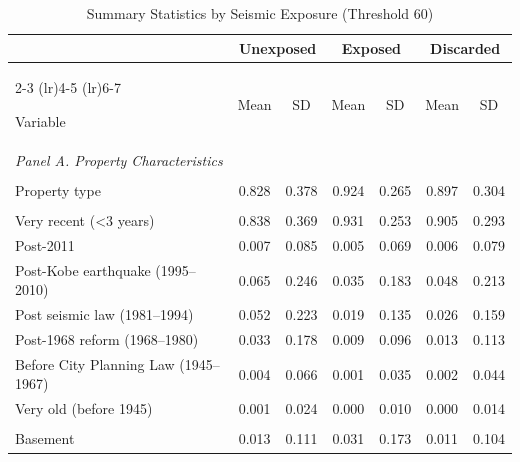 \begin{table}[htbp]
\centering
\caption{Summary Statistics by Seismic Exposure (Threshold 60)}
\label{tab:summary_seismic}

\small
\begin{tabular}{l*{3}{cc}}
\toprule
& \multicolumn{2}{c}{Unexposed}
& \multicolumn{2}{c}{Exposed}
& \multicolumn{2}{c}{Discarded} \\

\cmidrule(lr){2-3}
\cmidrule(lr){4-5}
\cmidrule(lr){6-7}

Variable 
& Mean & SD
& Mean & SD
& Mean & SD \\

\midrule


\multicolumn{7}{l}{\textit{Panel A. Property Characteristics}}\\
\addlinespace[3pt]


\multicolumn{7}{l}{\quad \textit{Property Type}}\\

Property type
&0.828&0.378
&0.924&0.265
&0.897&0.304\\


\addlinespace[4pt]
\multicolumn{7}{l}{\quad \textit{Building Age Group}}\\

Very recent (<3 years)
&0.838&0.369
&0.931&0.253
&0.905&0.293\\

Post-2011
&0.007&0.085
&0.005&0.069
&0.006&0.079\\

Post-Kobe earthquake (1995--2010)
&0.065&0.246
&0.035&0.183
&0.048&0.213\\

Post seismic law (1981--1994)
&0.052&0.223
&0.019&0.135
&0.026&0.159\\

Post-1968 reform (1968--1980)
&0.033&0.178
&0.009&0.096
&0.013&0.113\\

Before City Planning Law (1945--1967)
&0.004&0.066
&0.001&0.035
&0.002&0.044\\

Very old (before 1945)
&0.001&0.024
&0.000&0.010
&0.000&0.014\\


\addlinespace[4pt]
\multicolumn{7}{l}{\quad \textit{Floor Group}}\\

Basement
&0.013&0.111
&0.031&0.173
&0.011&0.104\\


\end{tabular}
\end{table}
